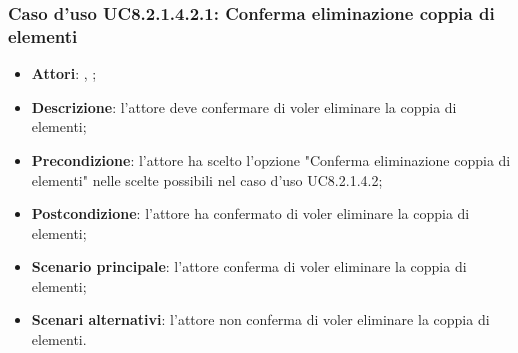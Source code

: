 		\subsubsection{Caso d'uso UC8.2.1.4.2.1: Conferma eliminazione coppia di elementi}
		\label{UC8.2.1.4.2.1}
		\begin{itemize}
			\item \textbf{Attori}: \uau, \uaupro;
			\item \textbf{Descrizione}: l'attore deve confermare di voler eliminare la coppia di elementi;
			\item \textbf{Precondizione}: l'attore ha scelto l'opzione "Conferma eliminazione coppia di elementi" nelle scelte possibili nel caso d'uso UC8.2.1.4.2;
			\item \textbf{Postcondizione}: l'attore ha confermato di voler eliminare la coppia di elementi;
			\item \textbf{Scenario principale}: l'attore conferma di voler eliminare la coppia di elementi;
			\item \textbf{Scenari alternativi}: l'attore non conferma di voler eliminare la coppia di elementi.
		\end{itemize}
	
